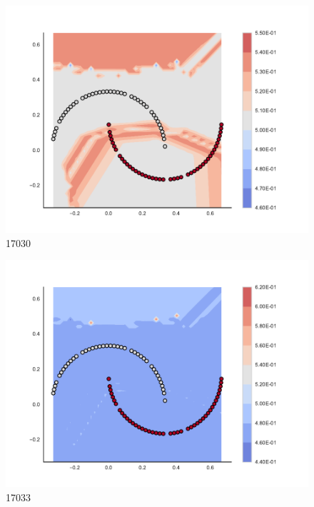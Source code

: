 \begin{subfigure}[b]{0.09\textwidth}
    \includegraphics[clip, trim=2.35cm 1.75cm 4.5cm 0cm,width=\textwidth]{img/convergence/17030.pdf}
    \caption{17030}
    \label{fig:convergence_17030}
\end{subfigure}
%
\begin{subfigure}[b]{0.09\textwidth}
    \includegraphics[clip, trim=2.35cm 1.75cm 4.5cm 0cm,width=\textwidth]{img/convergence/17033.pdf}
    \caption{17033}
    \label{fig:convergence_17033}
\end{subfigure}
%
